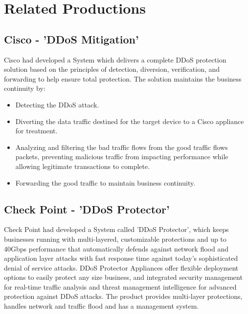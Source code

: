 \documentclass{report}
\begin{document}
\section {Related Productions}
 \hfill \break
\subsection {Cisco - 'DDoS Mitigation' } 
Cisco had developed a System which delivers a complete DDoS protection solution based on the principles of detection, diversion, verification, and forwarding to help ensure total protection\cite{cisco}. The solution maintains the business continuity by: 
\begin{itemize}
\item Detecting the DDoS attack.
\item Diverting  the data traffic destined for the target device to  a Cisco appliance for treatment.
\item Analyzing and filtering  the bad traffic flows from the good traffic flows packets, preventing malicious traffic from impacting performance while allowing legitimate transactions to complete.
\item Forwarding  the good traffic to maintain business continuity.
\end{itemize}

  \hfill \break

\subsection {Check Point -  'DDoS Protector' }
Check Point had developed a System called 'DDoS Protector'\cite{checkpoint}, which keeps businesses running with multi-layered, customizable protections and up to 40Gbps performance that automatically defends against network flood and application layer attacks with fast response time against today’s sophisticated denial of service attacks.
\hfill \break
DDoS Protector Appliances offer flexible deployment options to easily protect any size business, and integrated security management for real-time traffic analysis and threat management intelligence for advanced protection against DDoS attacks.
The product provides multi-layer protections, handles network and traffic flood and has a management system.
  \hfill \break



\newpage
{}
\printbibliography[title=References]
\end{document}
